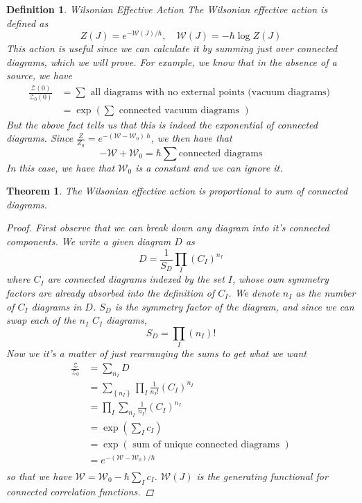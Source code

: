\documentclass[11pt, oneside]{article}   	%
\theoremstyle{slanted}
\newtheorem*{thm}{Theorem}
\newtheorem*{defn}{Definition}
\begin{document}
\begin{defn}{Wilsonian Effective Action}
The Wilsonian effective 
action is defined as 
\[
Z \left( J  \right)   = e^{  - \mathcal{ W } \left( J  \right)   / \hbar  }, 
\quad \mathcal{ W } \left( J  \right)  =  - \hbar \log Z \left( J  \right) 
\] This action is useful since 
we can calculate it by summing just over 
connected diagrams, which we will prove. 
For example, 
we know that in the absence of a source, we 
have 
\begin{align*}
\frac{\mathcal{ Z } \left( 0  \right)  }{
\mathcal{ Z } _ 0\left( 0 \right)  }  & = \sum \text{ all diagrams with no external points
(vacuum diagrams) } \\ 
		      & = \exp\left( \sum \text{ connected vacuum diagrams } \right) 
\end{align*}
But the above fact tells us that 
this is indeed the exponential of connected diagrams. Since 
$ \frac{Z }{ Z_0 }  = e ^{  -  \left( \mathcal{ W }  - \mathcal{ W } _ 0  \right)   \ \hbar }  $, 
we then have that 
\[
- \mathcal{ W } + \mathcal{ W } _ 0  = \hbar \sum \text{connected diagrams}
\] In this case, 
we have that $ \mathcal{ W }_ 0 $  is a 
constant and we can ignore it. 
\end{defn}

\begin{thm}{The Wilsonian effective 
action is proportional to sum of connected diagrams.}

\begin{proof}
First observe that we can break down any 
diagram into it's connected components. We 
write a given diagram $ D $ as 
\[
D = \frac{1}{S _ D } \prod_ I \left( C_ I  \right)  ^{ n _  I}
\] where $ C _ I $ are connected diagrams indexed 
by the set $ I $, whose own symmetry factors 
are already absorbed into the definition of $ C_ I $. 
We denote $ n _ I $ as the number of $ C _ I $ diagrams
in $ D $. $ S _ D $ is the symmetry factor of the diagram, 
and since we can swap each of the $ n _ I $ $C _ I $ diagrams, 
\[
S_ D  = \prod_ I \left( n _ I  \right)  !  
\] 
Now we it's a matter of 
just rearranging the sums to get what we want
\begin{align*}
\frac{\mathcal{ Z } }{ \mathcal{ Z } _ 0 } &=  \sum_{ n _ I } D  \\ 
   &=  \sum _{ \left\{  n _ I  \right\}  } \prod_ I \frac{1}{ n _ I ! } \left( C _ I  \right)  ^{ n_  I }  \\
   &=  \prod_ I 
   \sum _{ n _ I } \frac{1}{n _ I ! }
   \left( C _ I  \right)  ^{ n _ I } 
   \\
   &=  \exp \left( \sum _ I c _ I  \right)  \\
   &=  \exp \left( \text{ 
   sum of unique connected diagrams }  \right)   \\
   &=  e ^{  - \left( \mathcal{ W } 
    - \mathcal{ W } _ 0 \right)   / \hbar }  \\
\end{align*}
so that we have $ \mathcal{ W }  = \mathcal{ W } _ 0  - \hbar \sum _ I c _ I $. 
$ \mathcal{ W } \left( J  \right)  $ is the 
generating functional for connected 
correlation functions. 

\end{proof}
\end{thm}
\end{document}
